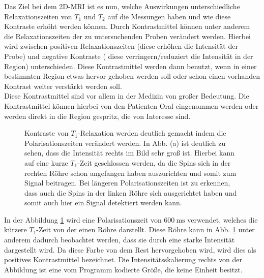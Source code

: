 Das Ziel bei dem 2D-MRI ist es nun, welche Auswirkungen unterschiedliche Relaxationszeiten von $T_1$ und $T_2$ auf die Messungen haben und wie diese Kontraste erhöht werden können. Durch Kontrastmittel können unter anderem die Relaxationszeiten der zu untersuchenden Proben verändert werden. Hierbei wird zwischen positiven Relaxationszeiten (diese erhöhen die Intensität der Probe) und negative Kontraste ( diese verringern/reduziert die Intensität in der Region) unterschieden.  Diese Kontrastmittel werden dann benutzt, wenn in einer bestimmten Region etwas hervor gehoben werden soll oder schon einen vorhanden Kontrast weiter verstärkt werden soll. \\
Diese Kontrastmittel sind vor allem in der Medizin von großer Bedeutung. Die Kontrastmittel können hierbei von den Patienten Oral eingenommen werden oder werden direkt in die Region gespritz, die von Interesse sind.   
\begin{figure}[H]
\centering
{}
{}
{}
{}
\caption[Kontraste von $T_1$-Relaxation werden deutlich gemacht indem die Polarisationszeiten verändert werden]{Kontraste von $T_1$-Relaxation werden deutlich gemacht indem die Polarisationszeiten verändert werden. In Abb. (a) ist deutlich zu sehen, dass die Intensität rechts im Bild sehr groß ist. Hierbei kann auf eine kurze $T_1$-Zeit geschlossen werden, da die Spins sich in der rechten Röhre schon angefangen haben auszurichten und somit zum Signal beitragen. Bei längeren Polarisationszeiten ist zu erkennen, dass auch die Spins in der linken Röhre sich ausgerichtet haben und somit auch hier ein Signal detektiert werden kann. }\label{fig:11600}
\end{figure}
In der Abbildung \ref{fig:11600} wird eine Polarisationszeit von $\SI{600}{\milli\second}$ verwendet,
 welches die kürzere $T_1$-Zeit von der einen Röhre darstellt. Diese Röhre kann in Abb. \ref{fig:11600} unter anderem dadurch beobachtet werden,
dass sie durch eine starke Intensität dargestellt wird. Da diese Farbe von dem Rest hervorgehoben wird, wird dies als positives Kontrastmittel bezeichnet.
Die Intensitätsskalierung rechts von der Abbildung ist eine vom Programm kodierte Größe, die keine Einheit besitzt.\\

